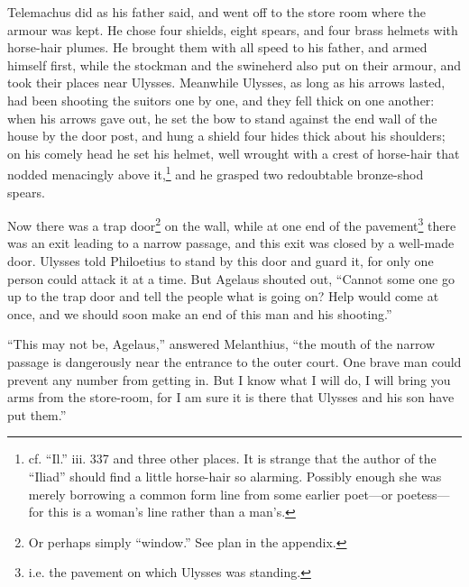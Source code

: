 Telemachus did as his father said, and went off to the store room where the
armour was kept. He chose four shields, eight spears, and four brass helmets
with horse-hair plumes. He brought them with all speed to his father, and armed
himself first, while the stockman and the swineherd also put on their armour,
and took their places near Ulysses. Meanwhile Ulysses, as long as his arrows
lasted, had been shooting the suitors one by one, and they fell thick on one
another: when his arrows gave out, he set the bow to stand against the end wall
of the house by the door post, and hung a shield four hides thick about his
shoulders; on his comely head he set his helmet, well wrought with a crest of
horse-hair that nodded menacingly above it,\footnote{cf. “Il.” iii. 337 and three other places. It is strange that the author of
the “Iliad” should find a little horse-hair so alarming. Possibly enough she
was merely borrowing a common form line from some earlier poet—or poetess—for
this is a woman’s line rather than a man’s.} and he grasped two redoubtable
bronze-shod spears.

Now there was a trap door\footnote{Or perhaps simply “window.” See plan in the appendix.} on the wall, while at one end of
the pavement\footnote{i.e. the pavement on which Ulysses was standing.}
there was an exit leading to a narrow passage, and this exit was closed by a
well-made door. Ulysses told Philoetius to stand by this door and guard it, for
only one person could attack it at a time. But Agelaus shouted out, “Cannot
some one go up to the trap door and tell the people what is going on? Help
would come at once, and we should soon make an end of this man and his
shooting.”

“This may not be, Agelaus,” answered Melanthius, “the mouth of the narrow
passage is dangerously near the entrance to the outer court. One brave man
could prevent any number from getting in. But I know what I will do, I will
bring you arms from the store-room, for I am sure it is there that Ulysses and
his son have put them.”

